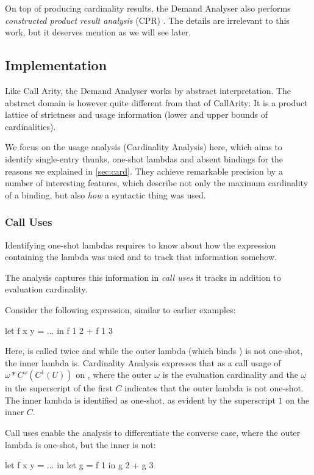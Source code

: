 On top of producing cardinality results, the Demand Analyser also performs \emph{constructed product result analysis} (CPR) \parencite{cpr}. 
The details are irrelevant to this work, but it deserves mention as we will see later.

\subsection{Implementation}

Like Call Arity, the Demand Analyser works by abstract interpretation.
The abstract domain is however quite different from that of CallArity:
It is a product lattice of strictness and usage information (\eg lower and upper bounds of cardinalities).

We focus on the usage analysis (Cardinality Analysis) here, which aims to identify single-entry thunks, one-shot lambdas and absent bindings \parencite[section~2]{card} for the reasons we explained in \cref{sec:card}.
They achieve remarkable precision by a number of interesting features, which describe not only the maximum cardinality of a binding, but also \emph{how} a syntactic thing was used.

\subsubsection{Call Uses}

Identifying one-shot lambdas requires to know about how the expression containing the lambda was used and to track that information somehow.

The analysis captures this information in \emph{call uses} it tracks in addition to evaluation cardinality.

Consider the following expression, similar to earlier examples:
\begin{haskellcode}
  let f x y = ...
  in f 1 2 + f 1 3
\end{haskellcode}

Here,  is called twice and while the outer lambda (which binds ) is not one-shot, the inner lambda is.
Cardinality Analysis expresses that as a call usage of $\omega*C^\omega(C^1(U))$ on , where the outer $\omega$ is the evaluation cardinality and the $\omega$ in the superscript of the first $C$ indicates that the outer lambda is not one-shot.
The inner lambda is identified as one-shot, as evident by the superscript $1$ on the inner $C$.

Call uses enable the analysis to differentiate the converse case, where the outer lambda is one-shot, but the inner is not:
\begin{haskellcode}
  let f x y = ...
  in let g = f 1
     in g 2 + g 3
\end{haskellcode}

